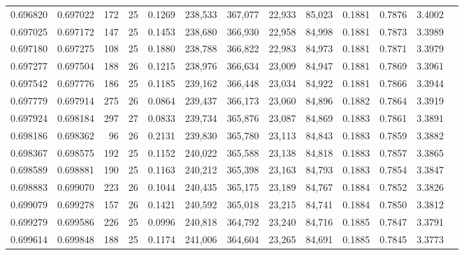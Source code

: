 \begin{tabular}{rrrrrrrrrrrrr}
0.696820 & 0.697022 &   172 &  25 &                                     0.1269 & 238,533 & 367,077 &  22,933 &  85,023 & 0.1881 & 0.7876 & 3.4002 \\
0.697025 & 0.697172 &   147 &  25 &                                     0.1453 & 238,680 & 366,930 &  22,958 &  84,998 & 0.1881 & 0.7873 & 3.3989 \\
0.697180 & 0.697275 &   108 &  25 &                                     0.1880 & 238,788 & 366,822 &  22,983 &  84,973 & 0.1881 & 0.7871 & 3.3979 \\
0.697277 & 0.697504 &   188 &  26 &                                     0.1215 & 238,976 & 366,634 &  23,009 &  84,947 & 0.1881 & 0.7869 & 3.3961 \\
0.697542 & 0.697776 &   186 &  25 &                                     0.1185 & 239,162 & 366,448 &  23,034 &  84,922 & 0.1881 & 0.7866 & 3.3944 \\
0.697779 & 0.697914 &   275 &  26 &                                     0.0864 & 239,437 & 366,173 &  23,060 &  84,896 & 0.1882 & 0.7864 & 3.3919 \\
0.697924 & 0.698184 &   297 &  27 &                                     0.0833 & 239,734 & 365,876 &  23,087 &  84,869 & 0.1883 & 0.7861 & 3.3891 \\
0.698186 & 0.698362 &    96 &  26 &                                     0.2131 & 239,830 & 365,780 &  23,113 &  84,843 & 0.1883 & 0.7859 & 3.3882 \\
0.698367 & 0.698575 &   192 &  25 &                                     0.1152 & 240,022 & 365,588 &  23,138 &  84,818 & 0.1883 & 0.7857 & 3.3865 \\
0.698589 & 0.698881 &   190 &  25 &                                     0.1163 & 240,212 & 365,398 &  23,163 &  84,793 & 0.1883 & 0.7854 & 3.3847 \\
0.698883 & 0.699070 &   223 &  26 &                                     0.1044 & 240,435 & 365,175 &  23,189 &  84,767 & 0.1884 & 0.7852 & 3.3826 \\
0.699079 & 0.699278 &   157 &  26 &                                     0.1421 & 240,592 & 365,018 &  23,215 &  84,741 & 0.1884 & 0.7850 & 3.3812 \\
0.699279 & 0.699586 &   226 &  25 &                                     0.0996 & 240,818 & 364,792 &  23,240 &  84,716 & 0.1885 & 0.7847 & 3.3791 \\
0.699614 & 0.699848 &   188 &  25 &                                     0.1174 & 241,006 & 364,604 &  23,265 &  84,691 & 0.1885 & 0.7845 & 3.3773 \\

\end{tabular}
